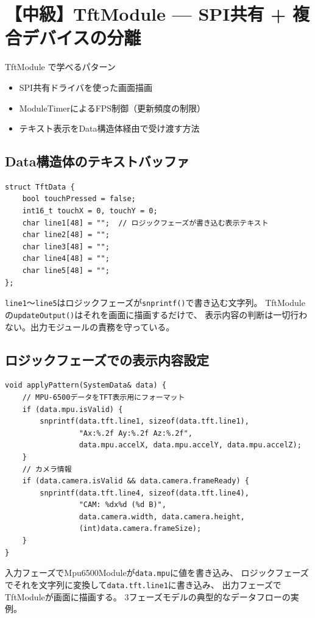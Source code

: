 \section{【中級】TftModule — SPI共有 + 複合デバイスの分離}

\begin{patternbox}{TftModule で学べるパターン}
\begin{itemize}
    \item SPI共有ドライバを使った画面描画
    \item ModuleTimerによるFPS制御（更新頻度の制限）
    \item テキスト表示をData構造体経由で受け渡す方法
\end{itemize}
\end{patternbox}

\subsection{Data構造体のテキストバッファ}

\begin{lstlisting}[style=cppstyle, caption={TftModule.h — Data}]
struct TftData {
    bool touchPressed = false;
    int16_t touchX = 0, touchY = 0;
    char line1[48] = "";  // ロジックフェーズが書き込む表示テキスト
    char line2[48] = "";
    char line3[48] = "";
    char line4[48] = "";
    char line5[48] = "";
};
\end{lstlisting}

\begin{pointbox}
\texttt{line1}〜\texttt{line5}はロジックフェーズが\texttt{snprintf()}で書き込む文字列。
TftModuleの\texttt{updateOutput()}はそれを画面に描画するだけで、
表示内容の判断は一切行わない。出力モジュールの責務を守っている。
\end{pointbox}

\subsection{ロジックフェーズでの表示内容設定}

\begin{lstlisting}[style=cppstyle, caption={main.cpp — applyPattern()でのTFT表示設定}]
void applyPattern(SystemData& data) {
    // MPU-6500データをTFT表示用にフォーマット
    if (data.mpu.isValid) {
        snprintf(data.tft.line1, sizeof(data.tft.line1),
                 "Ax:%.2f Ay:%.2f Az:%.2f",
                 data.mpu.accelX, data.mpu.accelY, data.mpu.accelZ);
    }
    // カメラ情報
    if (data.camera.isValid && data.camera.frameReady) {
        snprintf(data.tft.line4, sizeof(data.tft.line4),
                 "CAM: %dx%d (%d B)",
                 data.camera.width, data.camera.height,
                 (int)data.camera.frameSize);
    }
}
\end{lstlisting}

\begin{pointbox}
入力フェーズでMpu6500Moduleが\texttt{data.mpu}に値を書き込み、
ロジックフェーズでそれを文字列に変換して\texttt{data.tft.line1}に書き込み、
出力フェーズでTftModuleが画面に描画する。
3フェーズモデルの典型的なデータフローの実例。
\end{pointbox}
